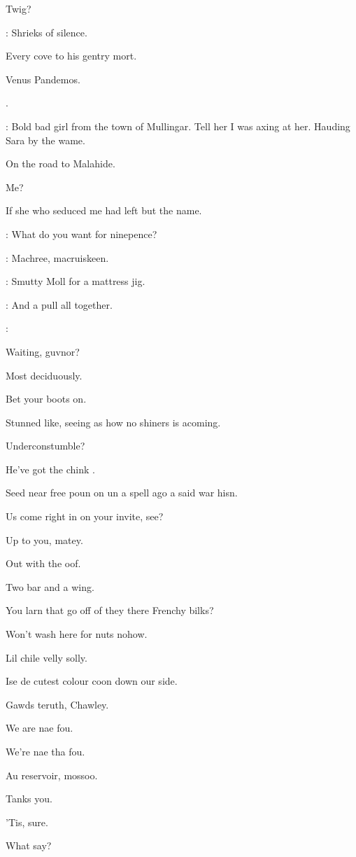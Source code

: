 Twig?

:
Shrieks of silence.

Every cove to his gentry mort.

Venus Pandemos.

.

\bannon:
Bold bad girl from the town of Mullingar.
Tell her I was axing at her.
Hauding Sara by the wame.

On the road to Malahide.

Me?

If she who seduced me had left but the name.

\lenehan:
What do you want for ninepence?

\stephen:
Machree,
macruiskeen.

\lynch:
Smutty Moll for a mattress jig.

\punch:
And a pull all together.

\All:


Waiting,
guvnor?

Most deciduously.

Bet your boots on.

Stunned like,
seeing as how no shiners is acoming.

Underconstumble?

He've got the chink .

Seed near free poun on un a spell ago a said war hisn.

Us come right in on your invite,
see?

Up to you,
matey.

Out with the oof.

Two bar and a wing.

You larn that go off of they there Frenchy bilks?

Won't wash here for nuts nohow.

Lil chile velly solly.

Ise de cutest colour coon down our side.

Gawds teruth,
Chawley.

We are nae fou.

We're nae tha fou.

Au reservoir,
mossoo.

Tanks you.


'Tis,
sure.

What say?

